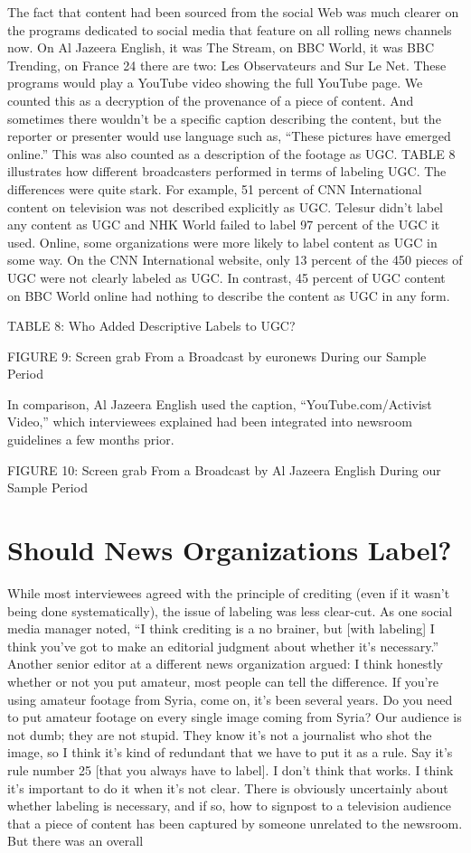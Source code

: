 \documentclass[symmetric, notoc, nobib]{towcenter-book}
\begin{document}
The fact that content had been sourced from the social Web was much
clearer on the programs dedicated to social media that feature on all rolling
news channels now. On Al Jazeera English, it was The Stream, on BBC
World, it was BBC Trending, on France 24 there are two: Les Observateurs
and Sur Le Net. These programs would play a YouTube video showing the
full YouTube page. We counted this as a decryption of the provenance of
a piece of content. And sometimes there wouldn't be a specific caption
describing the content, but the reporter or presenter would use language
such as, ``These pictures have emerged online.'' This was also counted as a
description of the footage as UGC.
TABLE 8 illustrates how different broadcasters performed in terms of labeling
UGC. The differences were quite stark. For example, 51 percent of CNN
International content on television was not described explicitly as UGC.
Telesur didn't label any content as UGC and NHK World failed to label 97
percent of the UGC it used. Online, some organizations were more likely
to label content as UGC in some way. On the CNN International website,
only 13 percent of the 450 pieces of UGC were not clearly labeled as UGC.
In contrast, 45 percent of UGC content on BBC World online had nothing
to describe the content as UGC in any form.

TABLE 8: Who Added Descriptive Labels to UGC?

FIGURE 9: Screen grab From a Broadcast by euronews During our Sample Period


In comparison, Al Jazeera English used the caption, ``YouTube.com/Activist
Video,'' which interviewees explained had been integrated into newsroom
guidelines a few months prior.

FIGURE 10: Screen grab From a Broadcast by Al Jazeera English During our Sample Period
\section{Should News Organizations Label?}
While most interviewees agreed with the principle of crediting (even if it
wasn't being done systematically), the issue of labeling was less clear-cut. As
one social media manager noted, ``I think crediting is a no brainer, but [with
labeling] I think you've got to make an editorial judgment about whether it's
necessary.'' Another senior editor at a different news organization argued:
I think honestly whether or not you put amateur, most people can tell
the difference. If you're using amateur footage from Syria, come on,
it's been several years. Do you need to put amateur footage on every
single image coming from Syria? Our audience is not dumb; they
are not stupid. They know it's not a journalist who shot the image,
so I think it's kind of redundant that we have to put it as a rule. Say
it's rule number 25 [that you always have to label]. I don't think that
works. I think it's important to do it when it's not clear.
There is obviously uncertainly about whether labeling is necessary, and if
so, how to signpost to a television audience that a piece of content has been
captured by someone unrelated to the newsroom. But there was an overall
\end{document}

